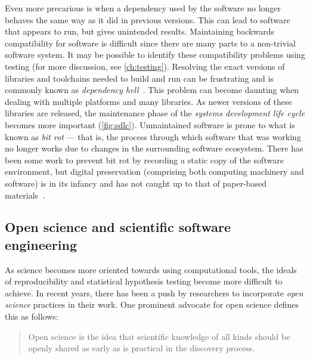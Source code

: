 { %
	Even more precarious is when a dependency used by the
	software no longer behaves the same way as it did in
	previous versions. This can lead to software that appears
	to run, but gives unintended results. Maintaining
	backwards compatibility for software is difficult since
	there are many parts to a non-trivial software system.
	It may be possible to identify these compatibility problems using
	testing (for more discussion, see \cref{ch:testing}).
	Resolving the exact versions of libraries and toolchains
	needed to build and run can be frustrating and is commonly
	known as \emph{dependency hell}~\autocite{anderson2000end,ModellingSoftDep:Burrows,Guo2011}.
	This problem can become
	daunting when dealing with multiple platforms and many
	libraries. As newer versions of these libraries are
	released, the maintenance phase of the \emph{systems
	development life cycle} becomes more important (\cref{fig:sdlc}).
	Unmaintained software is prone to what is known as
	\emph{bit rot} --- that is, the process through which
	software that was working no longer works due to changes
	in the surrounding software ecosystem.
	There has been some work to prevent bit rot by recording a
	static copy of the software environment, but digital
	preservation (comprising both computing machinery and
	software) is in its infancy and has not caught up to that
	of paper-based materials~\autocite{PreservingExe2013,Thain2015,Meng2015}.
}


\subsection{Open science and scientific software engineering}\label{subsec:open-science}

As science becomes more oriented towards using computational
tools, the ideals of reproducibility and statistical hypothesis
testing become more difficult to achieve. In recent years, there
has been a push by researchers to incorporate \emph{open science}
practices in their work. One prominent advocate for open science
defines this as follows:\vspace{-3.5\parskip}
\begin{quote}
	\begin{fancyquote}
	Open science is the idea that scientific knowledge of all kinds
	should be openly shared as early as is practical in the discovery
	process.
	\end{fancyquote}
\end{quote}

